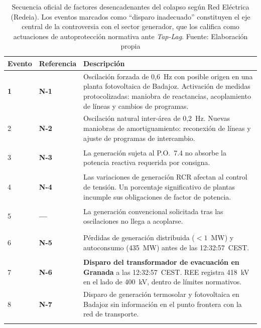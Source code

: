 \begin{table}[H]
\centering
\caption[Secuencia de factores desencadenantes del colapso según Red Eléctrica.]{%
Secuencia oficial de factores desencadenantes del colapso según Red
Eléctrica (Redeia). Los eventos marcados como ``disparo inadecuado''
constituyen el eje central de la controversia con el sector generador,
que los califica como actuaciones de autoprotección normativa ante
\textit{Tap-Lag}. Fuente: Elaboración propia}
\label{tab:decalogo_ree}
\vspace{0.3cm}
\small
\begin{tabularx}{\textwidth}{>{\centering\bfseries}p{1.1cm} >{\centering\bfseries}p{1.3cm} >{\centering\arraybackslash}X}
\toprule
\textbf{Evento} & \textbf{Referencia} & \textbf{Descripción} \\
\midrule

1 & N-1 &
Oscilación forzada de 0,6~Hz con posible origen en una planta
fotovoltaica de Badajoz. Activación de medidas protocolizadas: maniobra
de reactancias, acoplamiento de líneas y cambios de programas. \\
\addlinespace

2 & N-2 &
Oscilación natural inter-área de 0,2~Hz. Nuevas maniobras de
amortiguamiento: reconexión de líneas y ajuste de programas de
intercambio. \\
\addlinespace

3 & N-3 &
La generación sujeta al P.O.~7.4 no absorbe la potencia reactiva
requerida por consigna. \\
\addlinespace

4 & N-4 &
Las variaciones de generación RCR afectan al control de tensión. Un
porcentaje significativo de plantas incumple sus obligaciones de factor
de potencia. \\
\addlinespace

5 & --- &
La generación convencional solicitada tras las oscilaciones no llega a
acoplarse. \\
\addlinespace

6 & N-5 &
Pérdidas de generación distribuida ($<\!1$~MW) y autoconsumo (435~MW)
antes de las 12:32:57~CEST. \\
\addlinespace

7 & N-6 &
\textbf{Disparo del transformador de evacuación en Granada} a las
12:32:57~CEST. REE registra 418~kV en el lado de 400~kV, dentro de
límites normativos. \\
\addlinespace

8 & N-7 &
Disparo de generación termosolar y fotovoltaica en Badajoz sin
información en el punto frontera con la red de transporte. \\
\addlinespace


\end{tabularx}
\end{table}
